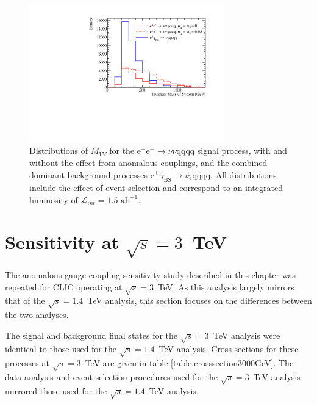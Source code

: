 \begin{figure}[h!]
\centering
\includegraphics[width=0.75\textwidth]{PhysicsAnalysis/Plots/NuisanceFit/1400GeV/NuisanceExplanation.pdf}
\caption[Distributions of $M_{VV}$ for the $\text{e}^{+}\text{e}^{-} \rightarrow \nu{\nu}\text{qqqq}$ signal process, with and without the effect from anomalous couplings, and the combined dominant background processes $\text{e}^{\pm}\gamma_{\text{BS}} \rightarrow \nu_{\text{e}}\text{qqqq}$.  All distributions include the effect of event selection and correspond to an integrated luminosity of $\mathcal{L}_{int} = 1.5\text{ ab}^{-1}$.]{Distributions of $M_{VV}$ for the $\text{e}^{+}\text{e}^{-} \rightarrow \nu{\nu}\text{qqqq}$ signal process, with and without the effect from anomalous couplings, and the combined dominant background processes $\text{e}^{\pm}\gamma_{\text{BS}} \rightarrow \nu_{\text{e}}\text{qqqq}$.  All distributions include the effect of event selection and correspond to an integrated luminosity of $\mathcal{L}_{int} = 1.5\text{ ab}^{-1}$.}
\label{fig:nuisanceexplanation1400GeV}
\end{figure}


\section{Sensitivity at $\sqrt{s}=3$~TeV}
The anomalous gauge coupling sensitivity study described in this chapter was repeated for CLIC operating at $\sqrt{s}=3$~TeV.  As this analysis largely mirrors that of the $\sqrt{s}=1.4$~TeV analysis, this section focuses on the differences between the two analyses.  

The signal and background final states for the $\sqrt{s}=3$~TeV analysis were identical to those used for the $\sqrt{s}=1.4$~TeV analysis.  Cross-sections for these processes at $\sqrt{s}=3$~TeV are given in table \ref{table:crosssection3000GeV}.  The data analysis and event selection procedures used for the $\sqrt{s}=3$~TeV analysis mirrored those used for the $\sqrt{s}=1.4$~TeV analysis.  

